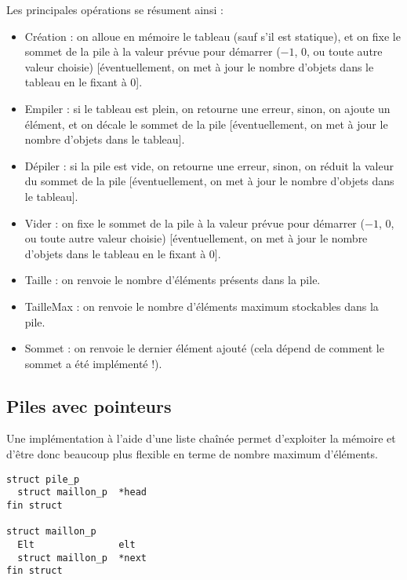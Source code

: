 \documentclass[11pt,a4paper]{article}
\begin{document}
Les principales opérations se résument ainsi :
\begin{itemize}
\item Création : on alloue en mémoire le tableau (sauf s'il est statique), et on fixe le sommet de la pile à la valeur prévue pour démarrer ($ -1 $, $ 0 $, ou toute autre valeur choisie) [éventuellement, on met à jour le nombre d'objets dans le tableau en le fixant à $ 0 $].
\item Empiler : si le tableau est plein, on retourne une erreur, sinon, on ajoute un élément, et on décale le sommet de la pile [éventuellement, on met à jour le nombre d'objets dans le tableau].
\item Dépiler : si la pile est vide, on retourne une erreur, sinon, on réduit la valeur du sommet de la pile [éventuellement, on met à jour le nombre d'objets dans le tableau].
\item Vider : on fixe le sommet de la pile à la valeur prévue pour démarrer ($ -1 $, $ 0 $, ou toute autre valeur choisie) [éventuellement, on met à jour le nombre d'objets dans le tableau en le fixant à $ 0 $].
\item Taille : on renvoie le nombre d'éléments présents dans la pile.
\item TailleMax : on renvoie le nombre d'éléments maximum stockables dans la pile.
\item Sommet : on renvoie le dernier élément ajouté (cela dépend de comment le sommet a été implémenté !).
\end{itemize}

\bigskip



\bigskip


\subsection{Piles avec pointeurs}

\bigskip

Une implémentation à l'aide d'une liste chaînée permet d'exploiter la mémoire et d'être donc beaucoup plus flexible en terme de nombre maximum d'éléments.

\begin{center}
\begin{lstlisting}[style=algorithmique]
struct pile_p
  struct maillon_p  *head
fin struct

struct maillon_p
  Elt               elt
  struct maillon_p  *next
fin struct \end{lstlisting}
\end{center}
\end{document}
